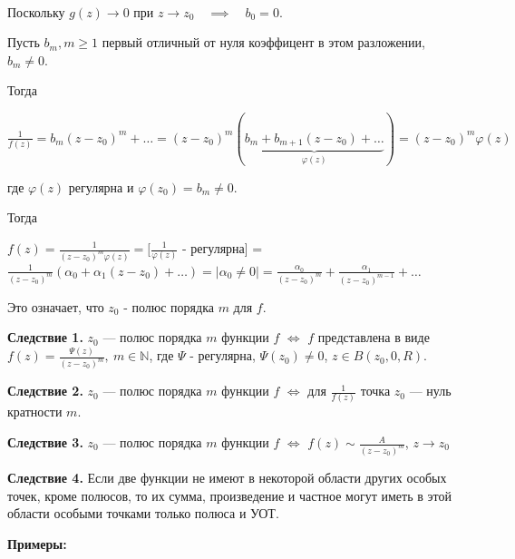 \documentclass[a4paper, 12pt]{report}
\begin{document}
		\\Поскольку $g(z) \to 0$ при $z \to z_0 \quad \implies \quad b_0 = 0$. \par\bigskip Пусть $b_m, m \geq 1$ первый отличный от нуля коэффицент в этом разложении, $b_m \neq 0$. 
		\par\bigskip Тогда \begin{center}
		    $\frac{1}{f(z)} = b_m(z -z_0)^m + \dots = (z - z_0)^m(\underbrace{b_m + b_{m+1}(z - z_0) + \dots}_{\varphi(z)}) = (z - z_0)^m \varphi(z)$
		\end{center} где $\varphi(z)$ регулярна и $\varphi(z_0) = b_m \neq 0.$
		\par\bigskip Тогда \par\bigskip $f(z) = \frac{1}{(z -z_0)^m \varphi(z)} = [\frac{1}{\varphi(z)}$ - регулярна] = $\frac{1}{(z - z_0)^m}(\alpha_0 + \alpha_1(z-z_0) + \dots) = |\alpha_0 \neq 0| =  \frac{\alpha_0}{(z - z_0)^m} + \frac{\alpha_1}{(z -z_0)^{m-1}} + \dots$
		\par\bigskip Это означает, что $z_0$ - полюс порядка $m$ для $f$. \quad
	\blacksquare
	\par\bigskip
	\textbf{Следствие 1.} \quad $z_0$ --- полюс порядка $m$ функции $f$ $\iff$ $f$ представлена в виде $f(z) =\frac{\Psi(z)}{(z - z_0)^m},\  m \in \mathbb{N}$, где $\Psi$ - регулярна, $\Psi(z_0) \neq 0$, $z \in B(z_0, 0, R)$.
	\par\bigskip
	\textbf{Следствие 2.} \quad $z_0$ --- полюс порядка $m$ функции $f$ $\iff$ для $\frac{1}{f(z)}$ точка $z_0$ --- нуль кратности $m$.
	\par\bigskip
	\textbf{Следствие 3.} \quad $z_0$ --- полюс порядка $m$ функции $f$ $\iff$ $f(z) \mathtt{\sim} \frac{A}{(z - z_0)^m}$, $z \to z_0$
	\par\bigskip
	\textbf{Следствие 4.} \quad Если две функции не имеют в некоторой области других особых точек, кроме полюсов, то их сумма, произведение и частное могут иметь в этой области особыми точками только полюса и УОТ.
	\par\bigskip
	\textbf{Примеры:}
\end{document}
